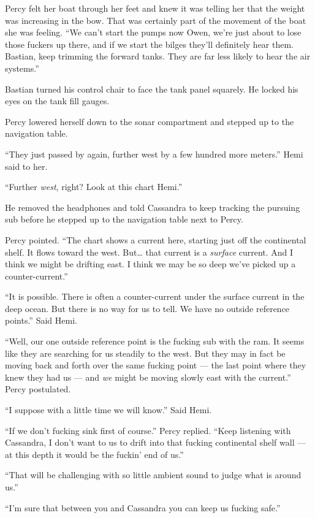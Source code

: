 \documentclass[
]{scrbook}
\begin{document}
Percy felt her boat through her feet and knew it was telling her that
the weight was increasing in the bow. That was certainly part of the
movement of the boat she was feeling. ``We can't start the pumps now
Owen, we're just about to lose those fuckers up there, and if we start
the bilges they'll definitely hear them. Bastian, keep trimming the
forward tanks. They are far less likely to hear the air systems.''

Bastian turned his control chair to face the tank panel squarely. He
locked his eyes on the tank fill gauges.

Percy lowered herself down to the sonar compartment and stepped up to
the navigation table.

``They just passed by again, further west by a few hundred more
meters.'' Hemi said to her.

``Further \emph{west}, right? Look at this chart Hemi.''

He removed the headphones and told Cassandra to keep tracking the
pursuing sub before he stepped up to the navigation table next to Percy.

Percy pointed. ``The chart shows a current here, starting just off the
continental shelf. It flows toward the west. But\ldots{} that current is
a \emph{surface} current. And I think we might be drifting east. I think
we may be so deep we've picked up a counter-current.''

``It is possible. There is often a counter-current under the surface
current in the deep ocean. But there is no way for us to tell. We have
no outside reference points.'' Said Hemi.

``Well, our one outside reference point is the fucking sub with the ram.
It seems like they are searching for us steadily to the west. But they
may in fact be moving back and forth over the same fucking point --- the
last point where they knew they had us --- and \emph{we} might be moving
slowly east with the current.'' Percy postulated.

``I suppose with a little time we will know.'' Said Hemi.

``If we don't fucking sink first of course.'' Percy replied. ``Keep
listening with Cassandra, I don't want to us to drift into that fucking
continental shelf wall --- at this depth it would be the fuckin' end of
us.''

``That will be challenging with so little ambient sound to judge what is
around us.''

``I'm sure that between you and Cassandra you can keep us fucking
safe.''
\end{document}

